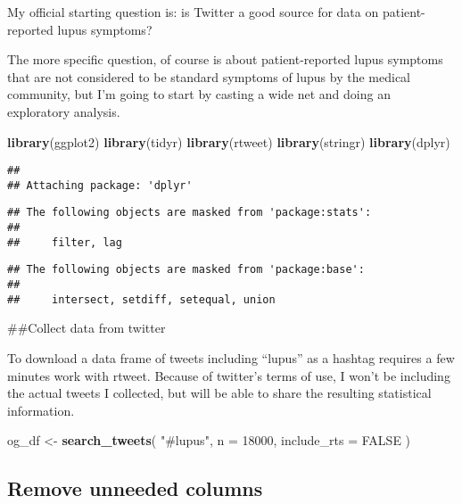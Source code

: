 \documentclass[]{article}
\newenvironment{Shaded}{\begin{snugshade}}{\end{snugshade}}
\newcommand{\DataTypeTok}[1]{\textcolor[rgb]{0.13,0.29,0.53}{#1}}
\newcommand{\DecValTok}[1]{\textcolor[rgb]{0.00,0.00,0.81}{#1}}
\newcommand{\KeywordTok}[1]{\textcolor[rgb]{0.13,0.29,0.53}{\textbf{#1}}}
\newcommand{\NormalTok}[1]{#1}
\newcommand{\OtherTok}[1]{\textcolor[rgb]{0.56,0.35,0.01}{#1}}
\newcommand{\StringTok}[1]{\textcolor[rgb]{0.31,0.60,0.02}{#1}}
\begin{document}
My official starting question is: is Twitter a good source for data on
patient-reported lupus symptoms?

The more specific question, of course is about patient-reported lupus
symptoms that are not considered to be standard symptoms of lupus by the
medical community, but I'm going to start by casting a wide net and
doing an exploratory analysis.

\begin{Shaded}
\begin{Highlighting}[]
\KeywordTok{library}\NormalTok{(ggplot2)}
\KeywordTok{library}\NormalTok{(tidyr)}
\KeywordTok{library}\NormalTok{(rtweet)}
\KeywordTok{library}\NormalTok{(stringr)}
\KeywordTok{library}\NormalTok{(dplyr)}
\end{Highlighting}
\end{Shaded}

\begin{verbatim}
## 
## Attaching package: 'dplyr'
\end{verbatim}

\begin{verbatim}
## The following objects are masked from 'package:stats':
## 
##     filter, lag
\end{verbatim}

\begin{verbatim}
## The following objects are masked from 'package:base':
## 
##     intersect, setdiff, setequal, union
\end{verbatim}

\#\#Collect data from twitter

To download a data frame of tweets including ``lupus'' as a hashtag
requires a few minutes work with rtweet. Because of twitter's terms of
use, I won't be including the actual tweets I collected, but will be
able to share the resulting statistical information.

\begin{Shaded}
\begin{Highlighting}[]
\NormalTok{og_df <-}\StringTok{ }\KeywordTok{search_tweets}\NormalTok{(}
  \StringTok{"#lupus"}\NormalTok{, }\DataTypeTok{n =} \DecValTok{18000}\NormalTok{, }\DataTypeTok{include_rts =} \OtherTok{FALSE}
\NormalTok{)}
\end{Highlighting}
\end{Shaded}

\hypertarget{remove-unneeded-columns}{%
\subsection{Remove unneeded columns}\label{remove-unneeded-columns}}
\end{document}
